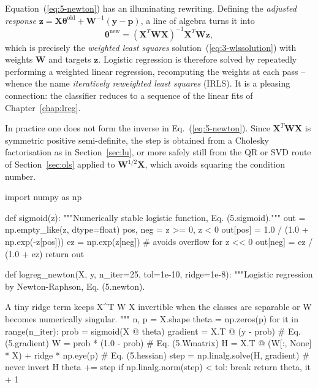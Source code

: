 Equation~(\ref{eq:5-newton}) has an illuminating rewriting.  Defining the
\emph{adjusted response}
$\bm{z}=\bm{X}\bm{\theta}^{\mathrm{old}}+\bm{W}^{-1}(\bm{y}-\bm{p})$, a line
of algebra turns it into
\begin{equation}
  \bm{\theta}^{\mathrm{new}}
   = \left(\bm{X}^{T}\bm{W}\bm{X}\right)^{-1}\bm{X}^{T}\bm{W}\bm{z},
  \label{eq:5-irls}
\end{equation}
which is precisely the \emph{weighted least squares}
solution~(\ref{eq:3-wlssolution}) with weights $\bm{W}$ and targets $\bm{z}$.
Logistic regression is therefore solved by repeatedly performing a weighted
linear regression, recomputing the weights at each pass -- whence the name
\emph{iteratively reweighted least squares} (IRLS).  It is a pleasing
connection: the classifier reduces to a sequence of the linear fits of
Chapter~\ref{chap:lreg}.

In practice one does not form the inverse in Eq.~(\ref{eq:5-newton}).  Since
$\bm{X}^{T}\bm{W}\bm{X}$ is symmetric positive semi-definite, the step is
obtained from a Cholesky factorisation as in Section~\ref{sec:lu}, or more
safely still from the QR or SVD route of Section~\ref{sec:ols} applied to
$\bm{W}^{1/2}\bm{X}$, which avoids squaring the condition number.

\begin{Python}{}
import numpy as np

def sigmoid(z):
    """Numerically stable logistic function, Eq. (5.sigmoid)."""
    out = np.empty_like(z, dtype=float)
    pos, neg = z >= 0, z < 0
    out[pos] = 1.0 / (1.0 + np.exp(-z[pos]))
    ez = np.exp(z[neg])                       # avoids overflow for z << 0
    out[neg] = ez / (1.0 + ez)
    return out


def logreg_newton(X, y, n_iter=25, tol=1e-10, ridge=1e-8):
    """Logistic regression by Newton-Raphson, Eq. (5.newton).

    A tiny ridge term keeps X^T W X invertible when the classes are
    separable or W becomes numerically singular.
    """
    n, p = X.shape
    theta = np.zeros(p)
    for it in range(n_iter):
        prob = sigmoid(X @ theta)
        gradient = X.T @ (y - prob)                       # Eq. (5.gradient)
        W = prob * (1.0 - prob)                           # Eq. (5.Wmatrix)
        H = X.T @ (W[:, None] * X) + ridge * np.eye(p)    # Eq. (5.hessian)
        step = np.linalg.solve(H, gradient)               # never invert H
        theta += step
        if np.linalg.norm(step) < tol:
            break
    return theta, it + 1
\end{Python}

